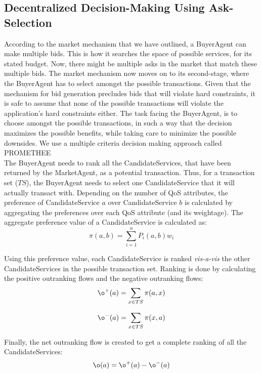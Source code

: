 \documentclass[10pt,journal,compsoc]{IEEEtran}
\begin{document}
\subsection{Decentralized Decision-Making Using Ask-Selection}\label{ask_selection}
According to the market mechanism that we have outlined, a BuyerAgent can make multiple bids. This is how it searches the space of possible services, for its stated budget. Now, there might be multiple asks in the market that match these multiple bids. The market mechanism now moves on to its second-stage, where the BuyerAgent has to select amongst the possible transactions. Given that the mechanism for bid generation precludes bids that will violate hard constraints, it is safe to assume that none of the possible transactions will violate the application's hard constraints either. The task facing the BuyerAgent, is to choose amongst the possible transactions, in such a way that the decision maximizes the possible benefits, while taking care to minimize the possible downsides. We use a multiple criteria decision making approach called PROMETHEE~\cite{Brans1985Preference}\\
The BuyerAgent needs to rank all the CandidateServices, that have been returned by the MarketAgent, as a potential transaction. Thus, for a transaction set ($TS$), the BuyerAgent needs to select one CandidateService that it will actually transact with. Depending on the number of QoS attributes, the preference of CandidateService $a$ over CandidateService $b$ is calculated by aggregating the preferences over each QoS attribute (and its weightage). The aggregate preference value of a CandidateService is calculated as:
\begin{equation}
\pi(a,b) = \sum_{i=1}^{n} P_{i}(a,b)w_{i}
\end{equation}

Using this preference value, each CandidateService is ranked \textit{vis-a-vis} the other CandidateServices in the possible transaction set. Ranking is done by calculating the positive outranking flows and the negative outranking flows:
\begin{equation}
\o^{+}(a) = \sum_{x \in TS}\pi(a,x)
\label{positive_outranking}
\end{equation}

\begin{equation}
\o^{-}(a) = \sum_{x \in TS}\pi(x,a)
\label{negative_outranking}
\end{equation}

Finally, the net outranking flow is created to get a complete ranking of all the CandidateServices:
\begin{equation}
\o(a) = \o^{+}(a) - \o^{-}(a)
\label{net_outranking}
\end{equation}
\end{document}
